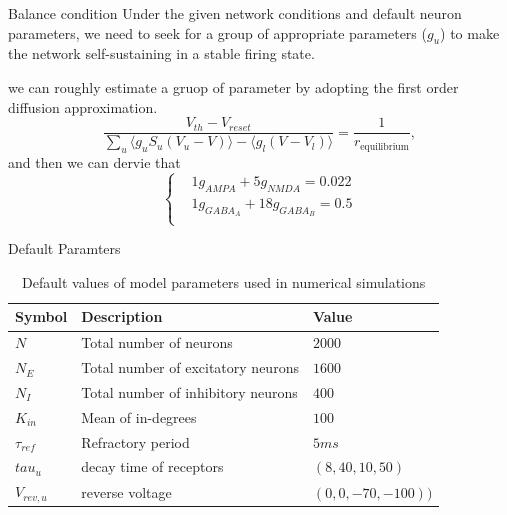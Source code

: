 \documentclass{beamer}
\begin{document}
\begin{frame}{Balance condition}
	Under the given network conditions and default neuron parameters, we need to seek for a group of appropriate parameters ($ g_{u} $) to make the network self-sustaining in a stable firing state.
	
	\par 
	we can roughly estimate a gruop of parameter by adopting the first order diffusion approximation.
	\begin{equation*}
		\dfrac{V_{th} - V_{reset}}{\sum_{u} \langle g_{u}S_{u}(V_u - V) \rangle - \langle g_{l}(V - V_{l})\rangle} = \dfrac{1 }{r_{\text{equilibrium}}},
	\end{equation*}	
	and then we can dervie that
	\begin{equation*}
		\left\{
		\begin{aligned}
			&1 g_{AMPA} + 5 g_{NMDA} = 0.022 \\
			&1 g_{GABA_{A}} + 18 g_{GABA_{B}} = 0.5\\
		\end{aligned}
		\right .
	\end{equation*}
	\par 
	
\end{frame}

\begin{frame}{Default Paramters}
	\begin{table}
		\centering
		\begin{tabular}{lll}
			Symbol & Description & Value\\
			\hline
			$N$ & Total number of neurons & $2000$\\
			$N_{E}$ & Total number of excitatory neurons & $1600$ \\
			$N_{I}$ & Total number of inhibitory neurons & $400$ \\
			$K_{in}$ &  Mean of in-degrees & $100$ \\
			$\tau_{ref}$ & Refractory period & $5ms$ \\
			$tau_{u}$ & decay time of receptors & $(8, 40, 10, 50)$ \\
			$V_{rev, u}$ & reverse voltage & $(0, 0, -70, -100))$ \\
		\end{tabular}
		\caption{Default values of model parameters used in numerical simulations}
		\label{tab:model_tabel}
	\end{table}
\end{frame}
\end{document}
